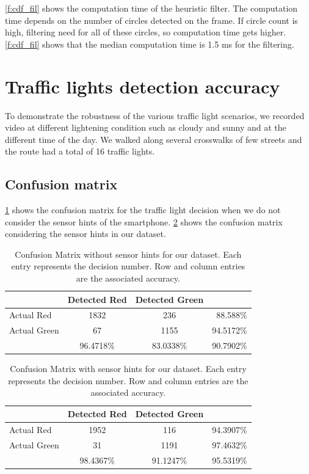 \ref{f:cdf_fil} shows the computation time of the heuristic filter.
The computation time depends on the number of circles detected on the frame.
If circle count is high, filtering need for all of these circles, so computation time gets higher.
\ref{f:cdf_fil} shows that the median computation time is 1.5 ms for the filtering. 





\section{Traffic lights detection accuracy}
\label{s:acc}
To demonstrate the robustness of the various traffic light scenarios, we recorded video at different lightening condition such as cloudy and sunny and at the different time of the day.
We walked along several crosswalks of few streets and the route had a total of 16 traffic lights.

\subsection{Confusion matrix}
\ref{t:con_nocrp} shows the confusion matrix for the traffic light decision when we do not consider the sensor hints of the smartphone.
\ref{t:con_crp} shows the confusion matrix considering the sensor hints in our dataset.

\begin{table}[ht!]
  \centering
  
  \begin{tabular}{  l  c  c  r }
    \rowcolor{gray!50}
     & Detected Red & Detected Green &  \\
    \hline
    Actual Red & 1832 & 236 & 88.588\% \\
    Actual Green & 67 & 1155 & 94.5172\% \\
    \hline
    & 96.4718\% & 83.0338\% & 90.7902\% \\
    
  \end{tabular}
  \caption{Confusion Matrix without sensor hints for our dataset. Each entry represents the decision number. Row and column entries are the associated accuracy.}
  \label{t:con_nocrp}
\end{table}

\begin{table}[ht!]
  \centering
  
  \begin{tabular}{  l  c  c  r }
    \rowcolor{gray!50}
     & Detected Red & Detected Green &  \\
    \hline
    Actual Red & 1952 & 116 & 94.3907\% \\
    Actual Green & 31 & 1191 & 97.4632\% \\
    \hline
    & 98.4367\% & 91.1247\% & 95.5319\% \\
    
  \end{tabular}
  \caption{Confusion Matrix with sensor hints for our  dataset. Each entry represents the decision number. Row and column entries are the associated accuracy.}
  \label{t:con_crp}
\end{table}

